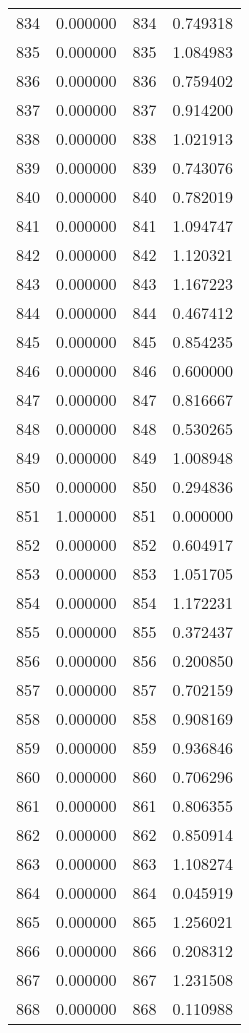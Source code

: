 \documentclass[12pt]{article}
\begin{document}
\begin{longtable}{@{}cccc@{}}
834 & 0.000000 & 834 & 0.749318 \\
835 & 0.000000 & 835 & 1.084983 \\
836 & 0.000000 & 836 & 0.759402 \\
837 & 0.000000 & 837 & 0.914200 \\
838 & 0.000000 & 838 & 1.021913 \\
839 & 0.000000 & 839 & 0.743076 \\
840 & 0.000000 & 840 & 0.782019 \\
841 & 0.000000 & 841 & 1.094747 \\
842 & 0.000000 & 842 & 1.120321 \\
843 & 0.000000 & 843 & 1.167223 \\
844 & 0.000000 & 844 & 0.467412 \\
845 & 0.000000 & 845 & 0.854235 \\
846 & 0.000000 & 846 & 0.600000 \\
847 & 0.000000 & 847 & 0.816667 \\
848 & 0.000000 & 848 & 0.530265 \\
849 & 0.000000 & 849 & 1.008948 \\
850 & 0.000000 & 850 & 0.294836 \\
851 & 1.000000 & 851 & 0.000000 \\
852 & 0.000000 & 852 & 0.604917 \\
853 & 0.000000 & 853 & 1.051705 \\
854 & 0.000000 & 854 & 1.172231 \\
855 & 0.000000 & 855 & 0.372437 \\
856 & 0.000000 & 856 & 0.200850 \\
857 & 0.000000 & 857 & 0.702159 \\
858 & 0.000000 & 858 & 0.908169 \\
859 & 0.000000 & 859 & 0.936846 \\
860 & 0.000000 & 860 & 0.706296 \\
861 & 0.000000 & 861 & 0.806355 \\
862 & 0.000000 & 862 & 0.850914 \\
863 & 0.000000 & 863 & 1.108274 \\
864 & 0.000000 & 864 & 0.045919 \\
865 & 0.000000 & 865 & 1.256021 \\
866 & 0.000000 & 866 & 0.208312 \\
867 & 0.000000 & 867 & 1.231508 \\
868 & 0.000000 & 868 & 0.110988 \\

\end{longtable}
\end{document}

